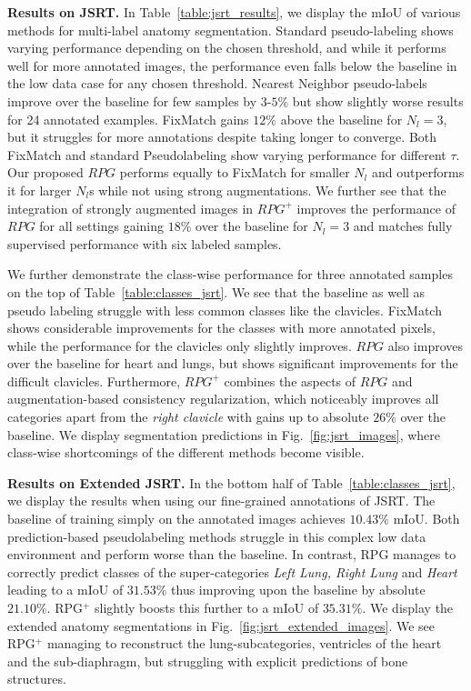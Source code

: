\documentclass[letterpaper]{article} %
\begin{document}
\noindent\textbf{Results on JSRT.} 
In Table~\ref{table:jsrt_results}, we display the mIoU of various methods for multi-label anatomy segmentation. 
Standard pseudo-labeling shows varying performance depending on the chosen threshold, and while it performs well for more annotated images,  the performance even falls below the baseline in the low data case for any chosen threshold. Nearest Neighbor pseudo-labels improve over the baseline for few samples by $3$-$5\%$ but show slightly worse results for 24 annotated examples. FixMatch gains $12\%$ above the baseline for $N_l=3$, but it struggles for more annotations despite taking longer to converge. Both FixMatch and standard Pseudolabeling show varying performance for different $\tau$. Our proposed $RPG$ performs equally to FixMatch for smaller $N_l$ and outperforms it for larger $N_l$s while not using strong augmentations. We further see that the integration of strongly augmented images in $RPG^+$ improves the performance of $RPG$ for all settings gaining $18\%$ over the baseline for $N_l=3$ and matches fully supervised performance with six labeled samples.

We further demonstrate the class-wise performance for three annotated samples on the top of Table~\ref{table:classes_jsrt}. We see that the baseline as well as pseudo labeling struggle with less common classes like the clavicles. FixMatch shows considerable improvements for the classes with more annotated pixels, while the performance for the clavicles only slightly improves. $RPG$ also improves over the baseline for heart and lungs,
but shows significant improvements for the difficult clavicles. Furthermore, $RPG^+$ combines the aspects of $RPG$ and augmentation-based consistency regularization, which noticeably improves all categories apart from the \textit{right clavicle} with gains up to absolute $26\%$ over the baseline. 
We display segmentation predictions in Fig.~\ref{fig:jsrt_images}, where class-wise shortcomings of the different methods become visible.


\noindent\textbf{Results on Extended JSRT.}
In the bottom half of Table~\ref{table:classes_jsrt}, we display the results when using our fine-grained annotations of JSRT. The baseline of training simply on the annotated images achieves $10.43\%$ mIoU. Both prediction-based pseudolabeling methods struggle in this complex low data environment and perform worse than the baseline. In contrast, RPG manages to correctly predict classes of the super-categories \textit{Left Lung, Right Lung} and \textit{Heart} leading to a mIoU of $31.53\%$ thus improving upon the baseline by absolute $21.10\%$. RPG$^+$ slightly boosts this further to a mIoU of $35.31\%$.
We display the extended anatomy segmentations in Fig.~\ref{fig:jsrt_extended_images}. We see RPG$^+$  managing to reconstruct the lung-subcategories, ventricles of the heart and the sub-diaphragm, but struggling with explicit predictions of bone structures. 
\end{document}
